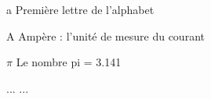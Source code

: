 \begin{listofsymbols}[3cm]
\item [a] Première lettre de l'alphabet
\item [A] Ampère : l'unité de mesure du courant 
\item [$\pi$] Le nombre pi = 3.141
\item [...] ...
\end{listofsymbols}